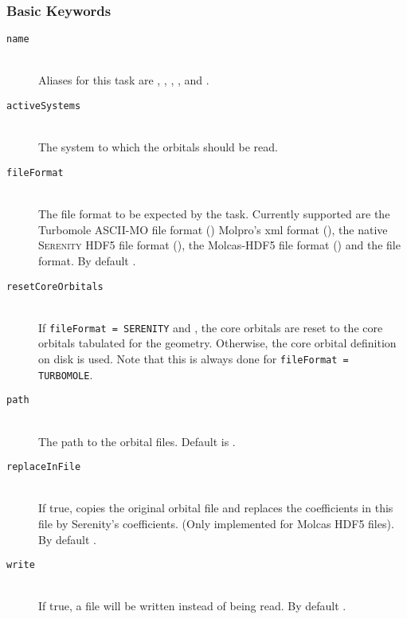 \subsubsection{Basic Keywords}
\begin{description}
 \item [\texttt{name}]\hfill \\
  Aliases for this task are , , , ,  and .
 \item [\texttt{activeSystems}]\hfill \\
  The system to which the orbitals should be read.
 \item [\texttt{fileFormat}]\hfill \\
  The file format to be expected by the task. Currently supported are the Turbomole ASCII-MO file format ()
  Molpro's xml format (), the native \textsc{Serenity} HDF5 file format (), the Molcas-HDF5 file
  format () and the  file format. By default .
 \item [\texttt{resetCoreOrbitals}]\hfill \\
  If \texttt{fileFormat = SERENITY} and , the core orbitals are reset to the core orbitals tabulated for the geometry. Otherwise, the core orbital
  definition on disk is used. Note that this is always done for \texttt{fileFormat = TURBOMOLE}.
 \item [\texttt{path}]\hfill \\
  The path to the orbital files. Default is .
 \item [\texttt{replaceInFile}]\hfill \\
  If true, copies the original orbital file and replaces the coefficients in this file by Serenity's coefficients. (Only implemented for Molcas HDF5 files).
  By default .
 \item [\texttt{write}]\hfill \\
  If true, a file will be written instead of being read. By default .
\end{description}
